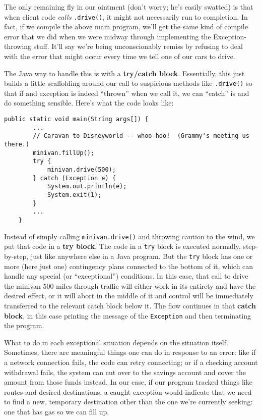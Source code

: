 The only remaining fly in our ointment (don't worry; he's easily swatted) is
that when client code \textit{calls} \texttt{.drive()}, it might not
necessarily run to completion. In fact, if we compile the above main program,
we'll get the same kind of compile error that we did when we were midway
through implementing the Exception-throwing stuff. It'll say we're being
unconscionably remiss by refusing to deal with the error that might occur
every time we tell one of our cars to drive.

The Java way to handle this is with a \textbf{try/catch block}. Essentially,
this just builds a little scaffolding around our call to suspicious methods
like \texttt{.drive()} so that if and exception is indeed ``thrown'' when we
call it, we can ``catch'' is and do something sensible. Here's what the code
looks like:

\begin{Verbatim}[samepage=true,fontsize=\footnotesize,frame=single]
    public static void main(String args[]) {
        ...
        // Caravan to Disneyworld -- whoo-hoo!  (Grammy's meeting us there.)
        minivan.fillUp();
        try {
            minivan.drive(500);
        } catch (Exception e) {
            System.out.println(e);
            System.exit(1);
        }
        ...
    }
\end{Verbatim}

Instead of simply calling \texttt{minivan.drive()} and throwing caution to the
wind, we put that code in a \textbf{try block}. The code in a \texttt{try}
block is executed normally, step-by-step, just like anywhere else in a Java
program. But the \texttt{try} block has one or more (here just one)
contingency plans connected to the bottom of it, which can handle any special
(or ``exceptional'') conditions. In this case, that call to drive the minivan
500 miles through traffic will either work in its entirety and have the
desired effect, or it will abort in the middle of it and control will be
immediately transferred to the relevant catch block below it. The flow
continues in that \textbf{catch block}, in this case printing the message of
the \texttt{Exception} and then terminating the program.

What to do in each exceptional situation depends on the situation itself.
Sometimes, there are meaningful things one can do in response to an error:
like if a network connection fails, the code can retry connecting; or if a
checking account withdrawal fails, the system can cut over to the savings
account and cover the amount from those funds instead. In our case, if our
program tracked things like routes and desired destinations, a caught
exception would indicate that we need to find a new, temporary destination
other than the one we're currently seeking: one that has gas so we can fill
up.

